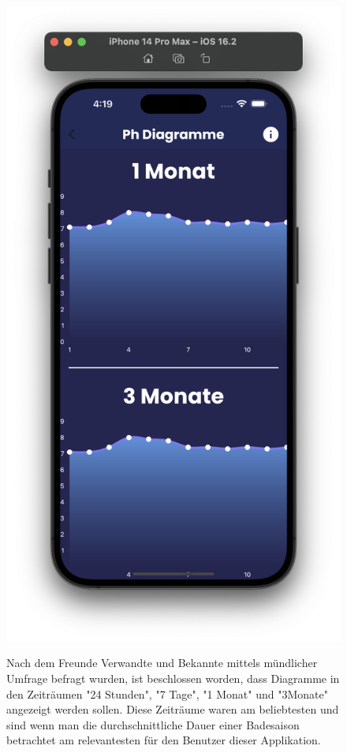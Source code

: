 \begin{figure}[h!]
    \begin{minipage}[c]{0.4\textwidth}
      \includegraphics[width=\textwidth]{./pics/Diagramme2Bild.png}
    \end{minipage}
    \begin{minipage}[c]{0.5\textwidth}
      \label{fig:DiagrammeApp2}
      Nach dem Freunde Verwandte und Bekannte mittels mündlicher Umfrage befragt wurden, ist beschlossen worden, dass
      Diagramme in den Zeiträumen "24 Stunden", "7 Tage", "1 Monat" und "3Monate" angezeigt werden sollen.
      Diese Zeiträume waren am beliebtesten und sind wenn man die durchschnittliche Dauer einer Badesaison betrachtet am relevantesten
      für den Benutzer dieser Applikation.
    \end{minipage}
\end{figure}
\newpage

